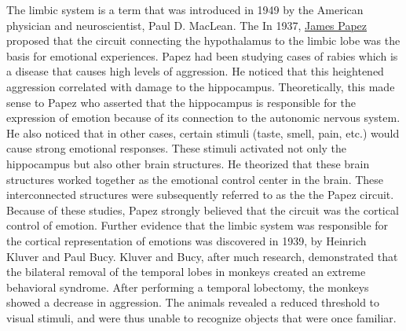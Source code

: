 The limbic system is a term that was introduced in 1949 by the American physician and neuroscientist, Paul D. MacLean. The In 1937, \href{https://en.wikipedia.org/wiki/James_Papez}{James Papez} proposed that the circuit connecting the hypothalamus to the limbic lobe was the basis for emotional experiences. Papez had been studying cases of rabies which is a disease that causes high levels of aggression. He noticed that this heightened aggression correlated with damage to the hippocampus. Theoretically, this made sense to Papez who asserted that the hippocampus is responsible for the expression of emotion because of its connection to the autonomic nervous system. He also noticed that in other cases, certain stimuli (taste, smell, pain, etc.) would cause strong emotional responses. These stimuli activated not only the hippocampus but also other brain structures. He theorized that these brain structures worked together as the emotional control center in the brain. These interconnected structures were subsequently referred to as the the Papez circuit. Because of these studies, Papez strongly believed that the circuit was the cortical control of emotion. Further evidence that the limbic system was responsible for the cortical representation of emotions was discovered in 1939, by Heinrich Kluver and Paul Bucy. Kluver and Bucy, after much research, demonstrated that the bilateral removal of the temporal lobes in monkeys created an extreme behavioral syndrome. After performing a temporal lobectomy, the monkeys showed a decrease in aggression. The animals revealed a reduced threshold to visual stimuli, and were thus unable to recognize objects that were once familiar.



